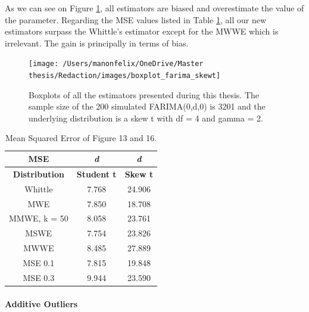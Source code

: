 \documentclass[
  11pt,
]{article}
\begin{document}
As we can see on Figure \ref{fig:box_farima_skewt}, all estimators are
biased and overestimate the value of the parameter. Regarding the MSE
values listed in Table \ref{tab:FARIMA_heavy_MSE}, all our new
estimators surpass the Whittle's estimator except for the MWWE which is
irrelevant. The gain is principally in terms of bias.

\hfill\break

\begin{figure}[h]

{\centering \texttt{[image: /Users/manonfelix/OneDrive/Master thesis/Redaction/images/boxplot\_farima\_skewt]} 

}

\caption{Boxplots of all the estimators presented during this thesis. The sample size of the 200 simulated FARIMA(0,d,0) is 3201 and the underlying distribution is a skew t with df = 4 and gamma = 2.}\label{fig:box_farima_skewt}
\end{figure}

\begin{table}[h]
\centering
\begin{tabular}{|c|c|c|}
\hline
\textbf{MSE}          & \textit{\textbf{d}} & \textit{\textbf{d}} \\ \hline
\textbf{Distribution} & \textbf{Student t}  & \textbf{Skew t}     \\ \hline
Whittle               & 7.768               & 24.906              \\ \hline
MWE                   & 7.850               & 18.708              \\ \hline
MMWE, k = 50          & 8.058               & 23.761              \\ \hline
MSWE                  & 7.754               & 23.826              \\ \hline
MWWE                  & 8.485               & 27.889              \\ \hline
MSE 0.1               & 7.815               & 19.848              \\ \hline
MSE 0.3               & 9.944               & 23.590              \\ \hline
\end{tabular}
\caption{Mean Squared Error of Figure 13 and 16.}
\label{tab:FARIMA_heavy_MSE}
\end{table}

\hypertarget{additive-outliers}{%
\paragraph{Additive Outliers}\label{additive-outliers}}
\end{document}
